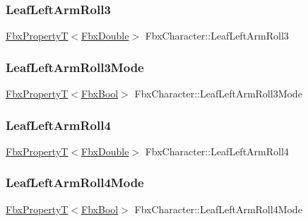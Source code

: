 \subsubsection{\texorpdfstring{Leaf\+Left\+Arm\+Roll3}{LeafLeftArmRoll3}}
{\footnotesize\ttfamily \hyperlink{class_fbx_property_t}{Fbx\+PropertyT}$<$\hyperlink{fbxtypes_8h_a171e72a1c46fc15c1a6c9c31948c1c5b}{Fbx\+Double}$>$ Fbx\+Character\+::\+Leaf\+Left\+Arm\+Roll3}

\mbox{\label{class_fbx_character_a43e2930b7cc27333684f4741f064471a}} 
\subsubsection{\texorpdfstring{Leaf\+Left\+Arm\+Roll3\+Mode}{LeafLeftArmRoll3Mode}}
{\footnotesize\ttfamily \hyperlink{class_fbx_property_t}{Fbx\+PropertyT}$<$\hyperlink{fbxtypes_8h_a92e0562b2fe33e76a242f498b362262e}{Fbx\+Bool}$>$ Fbx\+Character\+::\+Leaf\+Left\+Arm\+Roll3\+Mode}

\mbox{\label{class_fbx_character_a71eeeaeb6d7590b797a721b0ea597770}} 
\subsubsection{\texorpdfstring{Leaf\+Left\+Arm\+Roll4}{LeafLeftArmRoll4}}
{\footnotesize\ttfamily \hyperlink{class_fbx_property_t}{Fbx\+PropertyT}$<$\hyperlink{fbxtypes_8h_a171e72a1c46fc15c1a6c9c31948c1c5b}{Fbx\+Double}$>$ Fbx\+Character\+::\+Leaf\+Left\+Arm\+Roll4}

\mbox{\label{class_fbx_character_ac3828ba481f4976a8b14b411bbf146d2}} 
\subsubsection{\texorpdfstring{Leaf\+Left\+Arm\+Roll4\+Mode}{LeafLeftArmRoll4Mode}}
{\footnotesize\ttfamily \hyperlink{class_fbx_property_t}{Fbx\+PropertyT}$<$\hyperlink{fbxtypes_8h_a92e0562b2fe33e76a242f498b362262e}{Fbx\+Bool}$>$ Fbx\+Character\+::\+Leaf\+Left\+Arm\+Roll4\+Mode}

